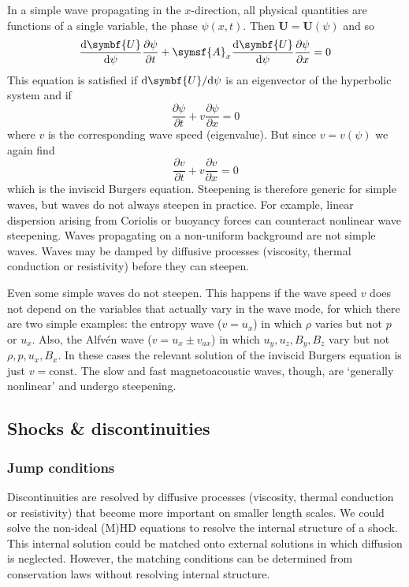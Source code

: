 \documentclass{jknotes}
\begin{document}
In a simple wave propagating in the $x$-direction, all physical quantities are
functions of a single variable, the phase $\psi(x,t)$. Then $\symbf{U} =
\symbf{U}(\psi)$ and so
\begin{equation}
	\frac{\diffd \symbf{U}}{\diffd \psi}\frac{\partial \psi}{\partial t} +
	\symsf{A}_x \frac{\diffd \symbf{U}}{\diffd \psi} \frac{\partial
	\psi}{\partial x} = 0
\end{equation}
This equation is satisfied if $\diffd \symbf{U}/\diffd \psi$ is an eigenvector
of the hyperbolic system and if
\begin{equation}
	\frac{\partial \psi}{\partial t} + v \frac{\partial \psi}{\partial x} = 0
\end{equation}
where $v$ is the corresponding wave speed (eigenvalue). But since $v =
v(\psi)$ we again find
\begin{equation}
	\frac{\partial v}{\partial t}+ v \frac{\partial v}{\partial x} = 0
\end{equation}
which is the inviscid Burgers equation.  Steepening is therefore generic for
simple waves, but waves do not always steepen in practice. For example, linear
dispersion arising from Coriolis or buoyancy forces can counteract nonlinear
wave steepening. Waves propagating on a non-uniform background are not simple
waves. Waves may be damped by diffusive processes (viscosity, thermal
conduction or resistivity) before they can steepen. 

Even some simple waves do not steepen. This happens if the wave
speed $v$ does not depend on the variables that actually vary in the wave
mode, for which there are two simple examples: the entropy wave ($v = u_x$) in
which $\rho$ varies but not $p$ or $u_x$. Also, the Alfv\'{e}n wave ($v=u_x
\pm v_{ax}$) in which $u_y, u_z, B_y, B_z$ vary but not $\rho, p, u_x, B_x$.
In these cases the relevant solution of the inviscid Burgers equation is just
$v = \text{const.}$ The slow and fast magnetoacoustic waves, though, are
`generally nonlinear' and undergo steepening.

\subsection{Shocks \& discontinuities}
\subsubsection{Jump conditions}
Discontinuities are resolved by diffusive processes (viscosity, thermal
conduction or resistivity) that become more important on smaller length
scales. We could solve the non-ideal (M)HD equations to resolve the internal
structure of a shock. This internal solution could be matched onto external
solutions in which diffusion is neglected. However, the matching conditions
can be determined from conservation laws without resolving internal structure.
\end{document}
